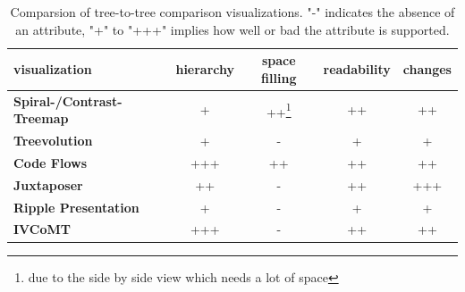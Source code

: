 


\begin{table}[tb]
\centering 
\begin{tabular}[r]{|l|c|c|c|c|} 
\hline
\textbf{visualization} & \textbf{hierarchy} & \textbf{space filling} & \textbf{readability} & \textbf{changes}\\
\hline
\hline
\textbf{Spiral-/Contrast-Treemap} & + & ++\footnote{due to the side by side view which needs a lot of space} & ++ & ++\\
\hline
\textbf{Treevolution} & + & - & + & +\\
\hline
\textbf{Code Flows} & +++ & ++ & ++ & ++\\
\hline
\textbf{Juxtaposer} & ++ & - & ++ & +++\\
\hline
\textbf{Ripple Presentation} & + & - & + & +\\
\hline
\textbf{IVCoMT} & +++ & - & ++ & ++ \\
\hline
\end{tabular}
\label{chap2:comparsion}
\vspace{0.5em} 
\caption{Comparsion of tree-to-tree comparison visualizations. "-" indicates the absence of an attribute, "+" to "+++" implies how well or bad the attribute is supported.}
\end{table}






